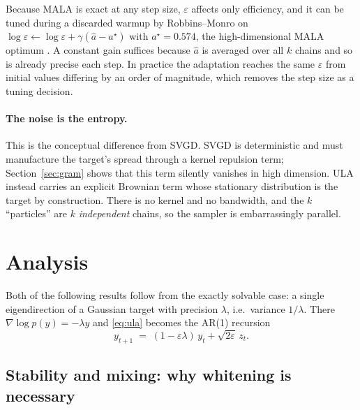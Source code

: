 \documentclass[11pt]{article}
\begin{document}
Because MALA is exact at any step size, $\varepsilon$ affects only efficiency, and it can be
tuned during a discarded warmup by Robbins--Monro on
$\log\varepsilon \leftarrow \log\varepsilon + \gamma(\hat a - a^\star)$ with
$a^\star = 0.574$, the high-dimensional MALA optimum \cite{robertsrosenthal}. A constant gain
suffices because $\hat a$ is averaged over all $k$ chains and so is already precise each step.
In practice the adaptation reaches the same $\varepsilon$ from initial values differing by an
order of magnitude, which removes the step size as a tuning decision.

\paragraph{The noise is the entropy.} This is the conceptual difference from SVGD. SVGD is
deterministic and must manufacture the target's spread through a kernel repulsion term;
Section~\ref{sec:gram} shows that this term silently vanishes in high dimension. ULA instead
carries an explicit Brownian term whose stationary distribution is the target by construction.
There is no kernel and no bandwidth, and the $k$ ``particles'' are $k$ \emph{independent} chains,
so the sampler is embarrassingly parallel.

\section{Analysis}
\label{sec:analysis}

Both of the following results follow from the exactly solvable case: a single eigendirection of a
Gaussian target with precision $\lambda$, i.e.\ variance $1/\lambda$. There
$\nabla \log p(y) = -\lambda y$ and \eqref{eq:ula} becomes the AR(1) recursion
\begin{equation}
  y_{t+1} \;=\; (1-\varepsilon\lambda)\, y_t + \sqrt{2\varepsilon}\, z_t.
  \label{eq:ar1}
\end{equation}

\subsection{Stability and mixing: why whitening is necessary}
\end{document}
